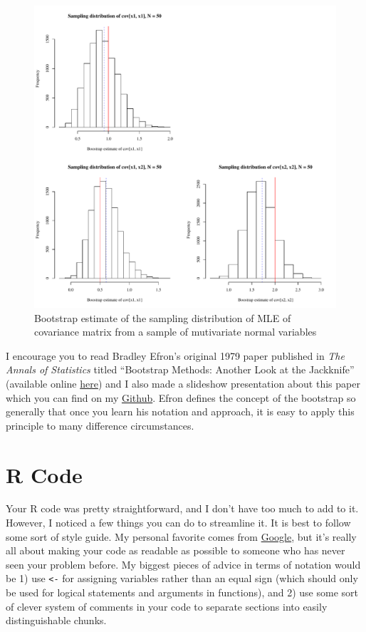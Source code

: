 \documentclass[11pt]{article}
\begin{document}
\begin{figure}[htp!]
	\centering
		\includegraphics[scale=0.6]{Sigma.pdf}
	\caption{Bootstrap estimate of the sampling distribution of MLE of covariance matrix from a sample of mutivariate normal variables}
\end{figure}

\pagebreak

I encourage you to read Bradley Efron's original 1979 paper published in \emph{The Annals of Statistics} titled ``Bootstrap Methods: Another Look at the Jackknife'' (available online \href{http://www.stat.cmu.edu/~fienberg/Statistics36-756/Efron1979.pdf}{here}) and I also made a slideshow presentation about this paper which you can find on my \href{https://github.com/spencerwoody/SDS190/blob/master/Spencer_slideshow.pdf}{Github}. Efron defines the concept of the bootstrap so generally that once you learn his notation and approach, it is easy to apply this principle to many difference circumstances. 

\section{\textsf{R} Code}

Your \textsf{R} code was pretty straightforward, and I don't have too much to add to it. However, I noticed a few things you can do to streamline it. It is best to follow some sort of style guide. My personal favorite comes from \href{https://google.github.io/styleguide/Rguide.xml}{Google}, but it's really all about making your code as readable as possible to someone who has never seen your problem before. My biggest pieces of advice in terms of notation would be 1) use \texttt{<-} for assigning variables rather than an equal sign (which should only be used for logical statements and arguments in functions), and 2) use some sort of clever system of comments in your code to separate sections into easily distinguishable chunks.
\end{document}
